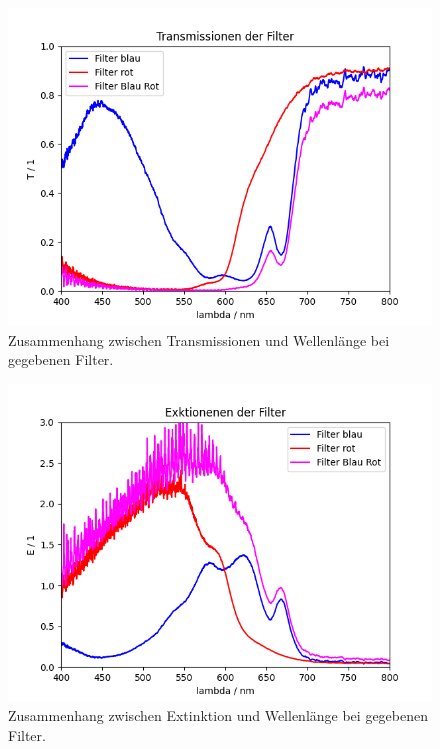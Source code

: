 \documentclass{article}
\begin{document}
\begin{figure}[H]
\centering
\caption{Zusammenhang zwischen Transmissionen und Wellenlänge bei gegebenen Filter.}
\label{fig:T}
\includegraphics[scale=0.7]{Transmissionen.png}
\end{figure}



\begin{figure}[H]
\centering
\caption{Zusammenhang zwischen Extinktion und Wellenlänge bei gegebenen Filter.}
\label{fig:T}
\includegraphics[scale=0.7]{Extinktionen.png}
\end{figure}
\end{document}
